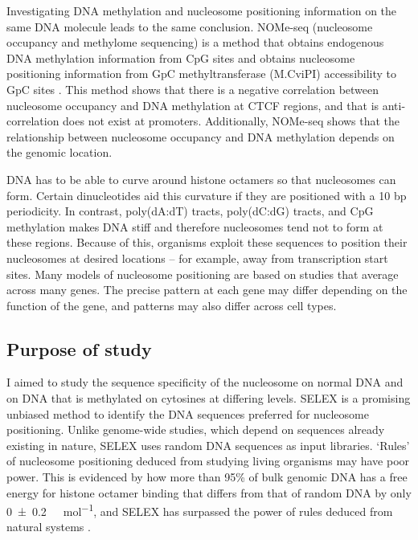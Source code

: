 \documentclass[parskip=full, numbers=noenddot]{scrreprt}
\begin{document}
Investigating DNA methylation and nucleosome positioning information on the same DNA molecule leads to the same conclusion.  NOMe-seq (nucleosome occupancy and methylome sequencing) is a method that obtains endogenous DNA methylation information from CpG sites and obtains nucleosome positioning information from GpC methyltransferase (M.CviPI) accessibility to GpC sites \citep{kelly_genome-wide_2012}.  This method shows that there is a negative correlation between nucleosome occupancy and DNA methylation at CTCF regions, and that is anti-correlation does not exist at promoters.  Additionally, NOMe-seq shows that the relationship between nucleosome occupancy and DNA methylation depends on the genomic location.


DNA has to be able to curve around histone octamers so that nucleosomes can form.  Certain dinucleotides aid this curvature if they are positioned with a 10 bp periodicity.  In contrast, poly(dA:dT) tracts, poly(dC:dG) tracts, and CpG methylation makes DNA stiff and therefore nucleosomes tend not to form at these regions.  Because of this, organisms exploit these sequences to position their nucleosomes at desired locations -- for example, away from transcription start sites.  Many models of nucleosome positioning are based on studies that average across many genes.  The precise pattern at each gene may differ depending on the function of the gene, and patterns may also differ across cell types.


\subsection{Purpose of study}
\label{ssec:emsaselex_intro_why}

I aimed to study the sequence specificity of the nucleosome on normal DNA and on DNA that is methylated on cytosines at differing levels.
SELEX is a promising unbiased method to identify the DNA sequences preferred for nucleosome positioning.  Unlike genome-wide studies, which depend on sequences already existing in nature, SELEX uses random DNA sequences as input libraries.  `Rules' of nucleosome positioning deduced from studying living organisms may have poor power.  This is evidenced by how more than 95\% of bulk genomic DNA has a free energy for histone octamer binding that differs from that of random DNA by only \SI{0+-0.2}{\kilo\calorie\per\mole}, and SELEX has surpassed the power of rules deduced from natural systems \citep{lowary_new_1998}.
\end{document}
